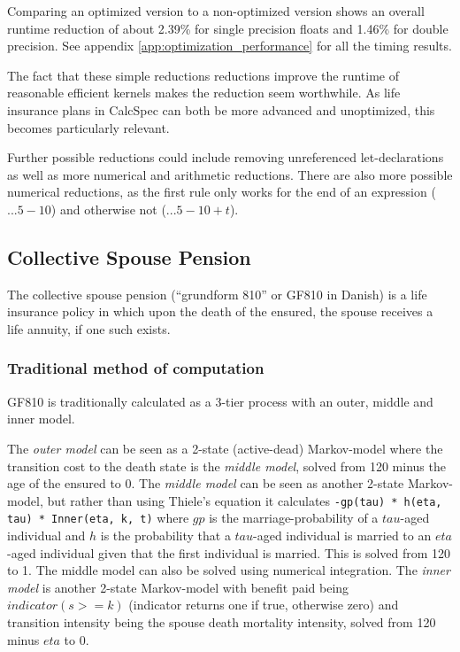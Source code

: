 Comparing an optimized version to a non-optimized version shows an overall runtime reduction of about 2.39\% for single precision floats and 1.46\% for double precision.
See appendix \ref{app:optimization_performance} for all the timing results.

The fact that these simple reductions reductions improve the runtime of reasonable efficient kernels makes the reduction seem worthwhile.
As life insurance plans in CalcSpec can both be more advanced and unoptimized, this becomes particularly relevant.

Further possible reductions could include removing unreferenced let-declarations as well as more numerical and arithmetic reductions.
There are also more possible numerical reductions, as the first rule only works for the end of an expression ($... 5 - 10$) and otherwise not ($... 5 - 10 + t$).

\subsection{Collective Spouse Pension}\label{sub:gf810}
The collective spouse pension (``grundform 810'' or GF810 in Danish) is a life insurance policy in which upon the death of the ensured, the spouse receives a life annuity, if one such exists.

\subsubsection{Traditional method of computation}
GF810 is traditionally calculated as a 3-tier process with an outer, middle and inner model.

The \emph{outer model} can be seen as a 2-state (active-dead) Markov-model where the transition cost to the death state is the \emph{middle model}, solved from 120 minus the age of the ensured to 0.
The \emph{middle model} can be seen as another 2-state Markov-model, but rather than using Thiele's equation it calculates \lstinline$-gp(tau) * h(eta, tau) * Inner(eta, k, t)$ where $gp$ is the marriage-probability of a $tau$-aged individual and $h$ is the probability that a $tau$-aged individual is married to an $eta$-aged individual given that the first individual is married.
This is solved from 120 to 1. The middle model can also be solved using numerical integration.
The \emph{inner model} is another 2-state Markov-model with benefit paid being $indicator(s >= k)$ (indicator returns one if true, otherwise zero) and transition intensity being the spouse death mortality intensity, solved from 120 minus $eta$ to 0.

